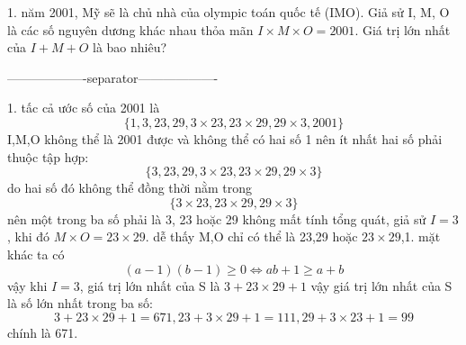 \documentclass{article}
\begin{document}
1. năm 2001, Mỹ sẽ là chủ nhà của olympic toán quốc tế (IMO). 
Giả sử I, M, O là các số nguyên dương khác nhau thỏa mãn $I\times M \times O=2001$. 
Giá trị lớn nhất của $I+M+O$ là bao nhiêu?

-------------------separator-------------------

1. tấc cả ước số của 2001 là
\[\{1, 3, 23, 29, 3\times 23, 23\times 29, 29\times 3, 2001\}\]
I,M,O không thể là 2001 được và không thể có hai số 1 nên ít nhất hai số phải thuộc tập hợp:
\[\{3, 23, 29, 3\times 23, 23\times 29, 29\times 3\}\]
do hai số đó không thể đồng thời nằm trong 
\[\{3\times 23, 23\times 29, 29\times 3\}\]
nên một trong ba số phải là 3, 23 hoặc 29
\newline
không mất tính tổng quát, giả sử $I=3$, khi đó $M\times O=23\times 29$.
dễ thấy M,O chỉ có thể là 23,29 hoặc $23\times 29$,1. mặt khác ta có
\[(a-1)(b-1)\geq 0 \Leftrightarrow ab+1 \geq a+b\]
vậy khi $I=3$, giá trị lớn nhất của S là $3+23\times 29 + 1$
vậy giá trị lớn nhất của S là số lớn nhất trong ba số:
\[3+23\times 29 + 1=671, 23 + 3 \times 29+1= 111, 29 + 3 \times 23+1=99\]
chính là 671.
\end{document}
